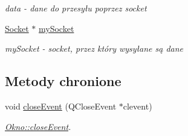 \begin{DoxyCompactItemize}
\begin{DoxyCompactList}\small\item\em data -\/ dane do przesyłu poprzez socket \end{DoxyCompactList}\item 
\hyperlink{class_socket}{Socket} $\ast$ \hyperlink{class_okno_a58a686222d1cc92f47d454c2481ce8d8}{my\+Socket}\hypertarget{class_okno_a58a686222d1cc92f47d454c2481ce8d8}{}\label{class_okno_a58a686222d1cc92f47d454c2481ce8d8}

\begin{DoxyCompactList}\small\item\em my\+Socket -\/ socket, przez który wysyłane są dane \end{DoxyCompactList}\end{DoxyCompactItemize}
\subsection*{Metody chronione}
\begin{DoxyCompactItemize}
\item 
void \hyperlink{class_okno_aecd3efa2e5687dad240bf830c73984ba}{close\+Event} (Q\+Close\+Event $\ast$clevent)
\begin{DoxyCompactList}\small\item\em \hyperlink{class_okno_aecd3efa2e5687dad240bf830c73984ba}{Okno\+::close\+Event}. \end{DoxyCompactList}\end{DoxyCompactItemize}
